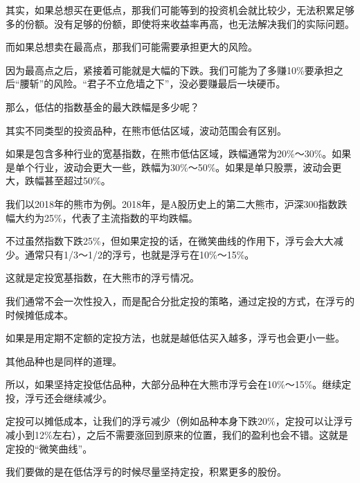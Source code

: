 其实，如果总想买在更低点，那我们可能等到的投资机会就比较少，无法积累足够多的份额。没有足够的份额，即使将来收益率再高，也无法解决我们的实际问题。

而如果总想卖在最高点，那我们可能需要承担更大的风险。

因为最高点之后，紧接着可能就是大幅的下跌。我们可能为了多赚10\%要承担之后“腰斩”的风险。“君子不立危墙之下”，没必要赚最后一块硬币。

那么，低估的指数基金的最大跌幅是多少呢？

其实不同类型的投资品种，在熊市低估区域，波动范围会有区别。

如果是包含多种行业的宽基指数，在熊市低估区域，跌幅通常为20\%～30\%。如果是单个行业，波动会更大一些，跌幅为30\%～50\%。如果是单只股票，波动会更大，跌幅甚至超过50\%。

我们以2018年的熊市为例。2018年，是A股历史上的第二大熊市，沪深300指数跌幅大约为25\%，代表了主流指数的平均跌幅。

不过虽然指数下跌25\%，但如果定投的话，在微笑曲线的作用下，浮亏会大大减少。通常只有1/3～1/2的浮亏，也就是浮亏在10\%～15\%。

这就是定投宽基指数，在大熊市的浮亏情况。

我们通常不会一次性投入，而是配合分批定投的策略，通过定投的方式，在浮亏的时候摊低成本。

如果是用定期不定额的定投方法，也就是越低估买入越多，浮亏也会更小一些。

其他品种也是同样的道理。

所以，如果坚持定投低估品种，大部分品种在大熊市浮亏会在10\%～15\%。继续定投，浮亏还会继续减少。

定投可以摊低成本，让我们的浮亏减少（例如品种本身下跌20\%，定投可以让浮亏减小到12\%左右），之后不需要涨回到原来的位置，我们的盈利也会不错。这就是定投的“微笑曲线”。

我们要做的是在低估浮亏的时候尽量坚持定投，积累更多的股份。
